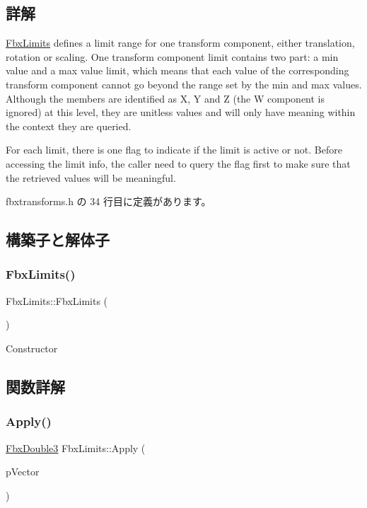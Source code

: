 \subsection{詳解}
\hyperlink{class_fbx_limits}{Fbx\+Limits} defines a limit range for one transform component, either translation, rotation or scaling. One transform component limit contains two part\+: a min value and a max value limit, which means that each value of the corresponding transform component cannot go beyond the range set by the min and max values. Although the members are identified as X, Y and Z (the W component is ignored) at this level, they are unitless values and will only have meaning within the context they are queried.

For each limit, there is one flag to indicate if the limit is active or not. Before accessing the limit info, the caller need to query the flag first to make sure that the retrieved values will be meaningful. 

 fbxtransforms.\+h の 34 行目に定義があります。



\subsection{構築子と解体子}
\mbox{\label{class_fbx_limits_a19b22bfab7e355c4d02cea76fa5a0716}} 
\subsubsection{\texorpdfstring{Fbx\+Limits()}{FbxLimits()}}
{\footnotesize\ttfamily Fbx\+Limits\+::\+Fbx\+Limits (\begin{DoxyParamCaption}{ }\end{DoxyParamCaption})}



Constructor 



\subsection{関数詳解}
\mbox{\label{class_fbx_limits_a6b64655b62833ad966cf868b4781bf86}} 
\subsubsection{\texorpdfstring{Apply()}{Apply()}}
{\footnotesize\ttfamily \hyperlink{fbxtypes_8h_ae0a96f14cde566774c7553aa7523b7a7}{Fbx\+Double3} Fbx\+Limits\+::\+Apply (\begin{DoxyParamCaption}\item[{const \hyperlink{fbxtypes_8h_ae0a96f14cde566774c7553aa7523b7a7}{Fbx\+Double3} \&}]{p\+Vector }\end{DoxyParamCaption})}

